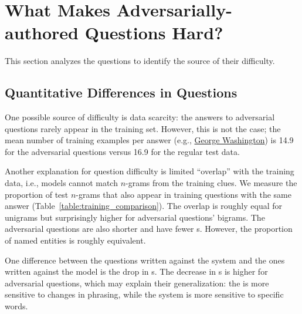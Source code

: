 \section{What Makes Adversarially-authored Questions Hard?}
\label{sec:limitations}

This section analyzes the
\challenge{}
questions to identify the source of their difficulty.

\subsection{Quantitative Differences in Questions}

One possible source of difficulty 
is data scarcity: the answers to adversarial questions rarely
appear in the training set. However, this is not the case;
the mean number of training examples per answer (e.g., \underline{George Washington})
is 14.9 for the adversarial questions versus
16.9 for the regular test data.

Another explanation for question difficulty
is limited 
``overlap'' with the training data, i.e.,
models cannot match $n$-grams
from the training clues. We measure the proportion of test $n$-grams
that also appear in training questions with the same answer
(Table~\ref{table:training_comparison}).
The overlap is roughly equal for unigrams but surprisingly higher for 
adversarial questions' bigrams.
The adversarial questions are also shorter
and have fewer s.
However, the
proportion of named entities is
roughly equivalent. 

One difference between the questions written against
the  system and the ones written against the  model
is the drop in s. The decrease in s is higher for  adversarial questions, which may explain their generalization: the 
is more sensitive to changes in phrasing, while the  system is more
sensitive to specific words.


